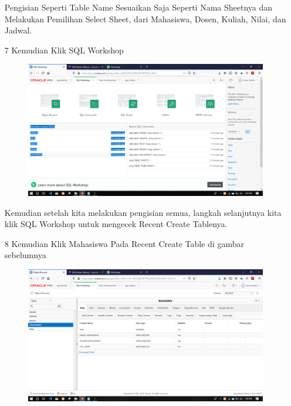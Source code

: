 \begin{enumerate}
\par
Pengisian Seperti Table Name Sesuaikan Saja Seperti Nama Sheetnya dan Melakukan Pemilihan Select Sheet, dari Mahasiswa, Dosen, Kuliah, Nilai, dan Jadwal.

\newpage
\item[7]Kemudian Klik SQL Workshop

\begin{figure}[!htbp]
    \begin{center}
    \includegraphics[scale=0.2]{figures/06.png}
    \end{center}   
    \end{figure}
    
\par
Kemudian setelah kita melakukan pengisian semua, langkah selanjutnya kita klik SQL Workshop untuk mengecek Recent Create Tablenya.

\item[8]Kemudian Klik Mahasiswa Pada Recent Create Table di gambar sebelumnya

\begin{figure}[!htbp]
    \begin{center}
    \includegraphics[scale=0.2]{figures/07.png}
    \end{center}   
    \end{figure}
    

\end{enumerate}
